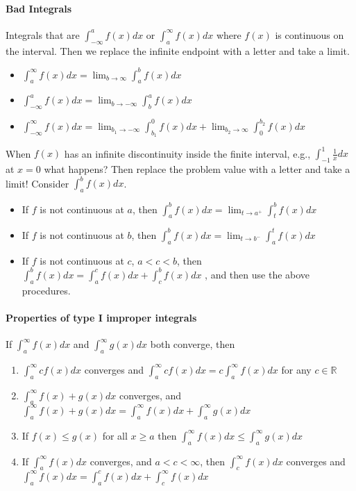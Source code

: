 \documentclass[10pt,letter]{article}
\begin{document}
\paragraph{Bad Integrals} 
Integrals that are $\int_{-\infty}^af(x)dx$ or $\int_a^\infty f(x)dx$ where $f(x)$ is continuous on the interval. Then we replace the infinite endpoint with a letter and take a limit. \begin{itemize}
    \item $\int_a^\infty f(x)dx=\lim_{b\rightarrow\infty}\int_a^bf(x)dx$ 
    \item $\int_{-\infty}^af(x)dx = \lim_{b\rightarrow-\infty}\int_b^af(x)dx$ 
    \item $\int_{-\infty}^\infty f(x)dx=\lim_{b_1\rightarrow-\infty}\int_{b_1}^0f(x)dx + \lim_{b_2\rightarrow\infty}\int_0^{b_2}f(x)dx$
\end{itemize}

When $f(x)$ has an infinite discontinuity inside the finite interval, e.g., $\int_{-1}^1\frac{1}{x}dx$ at $x=0$ what happens? Then replace the problem value with a letter and take a limit! Consider $\int_a^bf(x)dx$. \begin{itemize}
    \item If $f$ is not continuous at $a$, then $\int_a^bf(x)dx=\lim_{t\rightarrow a^+}\int_t^bf(x)dx$ 
    \item If $f$ is not continuous at $b$, then $\int_a^bf(x)dx=\lim_{t\rightarrow b^-}\int_a^tf(x)dx$ 
    \item If $f$ is not continuous at $c$, $a<c<b$, then $\int_a^bf(x)dx = \int_a^cf(x)dx+\int_c^bf(x)dx$ , and then use the above procedures. 
\end{itemize}

\paragraph{Properties of type I improper integrals} If $\int_a^\infty f(x)dx$ and $\int_a^\infty g(x)dx$ both converge, then \begin{enumerate}
    \item $\int_a^\infty cf(x)dx$ converges and $\int_a^\infty cf(x)dx=c\int_a^\infty f(x)dx$ for any $c\in\mathbb{R}$ 
    \item $\int_a^\infty f(x)+g(x)dx$ converges, and $\int_a^\infty f(x)+g(x)dx = \int_a^\infty f(x)dx + \int_a^\infty g(x)dx$ 
    \item If $f(x)\leq g(x)$ for all $x\geq a$ then $\int_a^\infty f(x)dx \leq \int_a^\infty g(x)dx$ 
    \item If $\int_a^\infty f(x)dx$ converges, and $a<c<\infty$, then $\int_c^\infty f(x)dx$ converges and $\int_a^\infty f(x)dx = \int_a^cf(x)dx + \int_c^\infty f(x)dx$
\end{enumerate}
\end{document}
